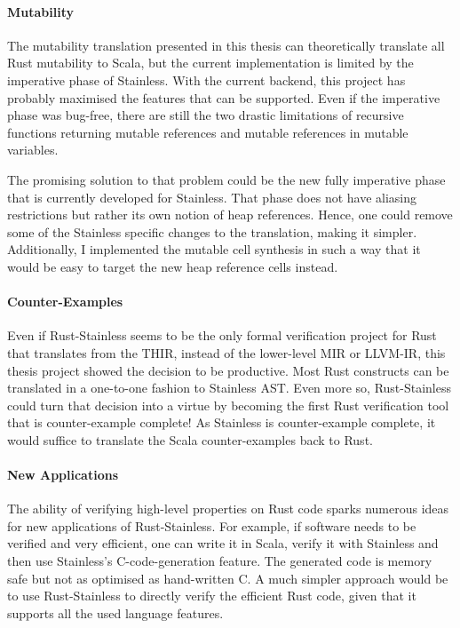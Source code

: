\paragraph{Mutability}

The mutability translation presented in this thesis can theoretically translate
all Rust mutability to Scala, but the current implementation is limited by the
imperative phase of Stainless. With the current backend, this project has
probably maximised the features that can be supported. Even if the imperative
phase was bug-free, there are still the two drastic limitations of recursive
functions returning mutable references and mutable references in mutable
variables.

The promising solution to that problem could be the new fully imperative phase
that is currently developed for Stainless. That phase does not have aliasing
restrictions but rather its own notion of heap references. Hence, one could
remove some of the Stainless specific changes to the translation, making it
simpler. Additionally, I implemented the mutable cell synthesis in such a way
that it would be easy to target the new heap reference cells instead.


\paragraph{Counter-Examples}

Even if Rust-Stainless seems to be the only formal verification project for Rust
that translates from the THIR, instead of the lower-level MIR or LLVM-IR, this
thesis project showed the decision to be productive. Most Rust constructs can be
translated in a one-to-one fashion to Stainless AST. Even more so,
Rust-Stainless could turn  that decision into a virtue by becoming the first
Rust verification tool that is counter-example complete! As Stainless is
counter-example complete, it would suffice to translate the Scala
counter-examples back to Rust.


\paragraph{New Applications}

The ability of verifying high-level properties on Rust code sparks numerous
ideas for new applications of Rust-Stainless. For example, if software needs to
be verified and very efficient, one can write it in Scala, verify it with
Stainless and then use Stainless's C-code-generation feature. The generated code
is memory safe but not as optimised as hand-written C. A much simpler approach
would be to use Rust-Stainless  to directly verify the efficient Rust code,
given that it supports all the used language features.

